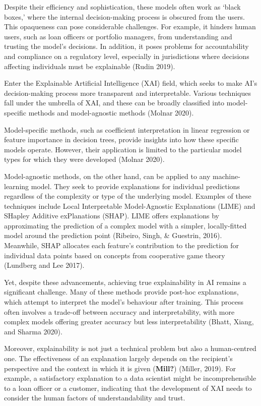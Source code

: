 \documentclass[
  letterpaper,
  DIV=11,
  numbers=noendperiod]{scrartcl}
\begin{document}
Despite their efficiency and sophistication, these models often work as
`black boxes,' where the internal decision-making process is obscured
from the users. This opaqueness can pose considerable challenges. For
example, it hinders human users, such as loan officers or portfolio
managers, from understanding and trusting the model's decisions. In
addition, it poses problems for accountability and compliance on a
regulatory level, especially in jurisdictions where decisions affecting
individuals must be explainable (Rudin 2019).

Enter the Explainable Artificial Intelligence (XAI) field, which seeks
to make AI's decision-making process more transparent and interpretable.
Various techniques fall under the umbrella of XAI, and these can be
broadly classified into model-specific methods and model-agnostic
methods (Molnar 2020).

Model-specific methods, such as coefficient interpretation in linear
regression or feature importance in decision trees, provide insights
into how these specific models operate. However, their application is
limited to the particular model types for which they were developed
(Molnar 2020).

Model-agnostic methods, on the other hand, can be applied to any
machine-learning model. They seek to provide explanations for individual
predictions regardless of the complexity or type of the underlying
model. Examples of these techniques include Local Interpretable
Model-Agnostic Explanations (LIME) and SHapley Additive exPlanations
(SHAP). LIME offers explanations by approximating the prediction of a
complex model with a simpler, locally-fitted model around the prediction
point (Ribeiro, Singh, \& Guestrin, 2016). Meanwhile, SHAP allocates
each feature's contribution to the prediction for individual data points
based on concepts from cooperative game theory (Lundberg and Lee 2017).

Yet, despite these advancements, achieving true explainability in AI
remains a significant challenge. Many of these methods provide post-hoc
explanations, which attempt to interpret the model's behaviour after
training. This process often involves a trade-off between accuracy and
interpretability, with more complex models offering greater accuracy but
less interpretability (Bhatt, Xiang, and Sharma 2020).

Moreover, explainability is not just a technical problem but also a
human-centred one. The effectiveness of an explanation largely depends
on the recipient's perspective and the context in which it is given
(\textbf{Mill?}) (Miller, 2019). For example, a satisfactory explanation
to a data scientist might be incomprehensible to a loan officer or a
customer, indicating that the development of XAI needs to consider the
human factors of understandability and trust.
\end{document}
